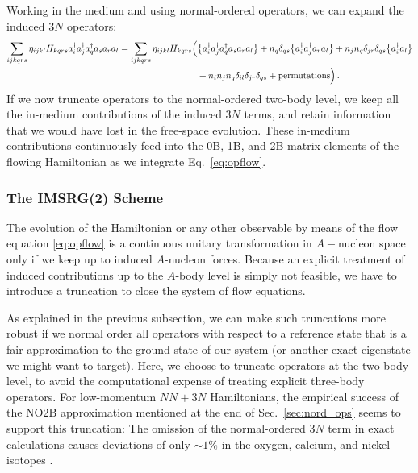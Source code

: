 {Working in the medium and using normal-ordered operators, we can expand the 
induced $3N$ operators:
\begin{align}\label{eq:induced_3N_no}
  \sum_{ijkqrs}\eta_{ijkl}H_{kqrs} \aaO_{i}\aaO_{j}\aaO_{q}\aO_{s}\aO_{r}\aO_{l}
  =\sum_{ijkqrs}\eta_{ijkl}H_{kqrs} 
    \Big(&
      \nord{\aaO_{i}\aaO_{j}\aaO_{q}\aO_{s}\aO_{r}\aO_{l}} 
       + n_q\delta_{qs}\nord{\aaO_{i}\aaO_{j}\aO_{r}\aO_{l}} 
       + n_j n_q\delta_{jr}\delta_{qs}\nord{\aaO_{i}\aO_{l}} \notag\\
  &
       + n_in_j n_q\delta_{il}\delta_{jr}\delta_{qs}+ \text{permutations}
    \Big)\,.
\end{align}
If we now truncate operators to the normal-ordered two-body level, we keep
all the in-medium contributions of the induced $3N$ terms, and retain 
information that we would have lost in the free-space evolution. These
in-medium contributions continuously feed into the 0B, 1B, and 2B matrix 
elements of the flowing Hamiltonian as we integrate Eq.~\eqref{eq:opflow}.

%
%
\subsubsection{The IMSRG(2) Scheme}
The evolution of the Hamiltonian or any other observable by means of
the flow equation \eqref{eq:opflow} is a continuous unitary transformation
in $A-$nucleon space only if we keep up to induced $A$-nucleon 
forces. Because an explicit treatment of induced contributions up to the 
$A$-body level is simply not feasible, we have to introduce a truncation 
to close the system of flow equations.

As explained in the previous subsection, we can make such truncations 
more robust if we normal order all operators with respect to a reference
state that is a fair approximation to the ground state of our system
(or another exact eigenstate we might want to target). Here, we choose
to truncate operators at the two-body level, to avoid the computational
expense of treating explicit three-body operators. For low-momentum $NN+3N$
Hamiltonians, the empirical success of the NO2B approximation mentioned 
at the end of Sec.~\ref{sec:nord_ops} seems to support this truncation: 
The omission of the normal-ordered $3N$ term in exact calculations causes 
deviations of only $\sim1\%$ in the oxygen, calcium, and nickel isotopes
\cite{Roth:2012qf,Binder:2013fk,Binder:2014fk}.

}
